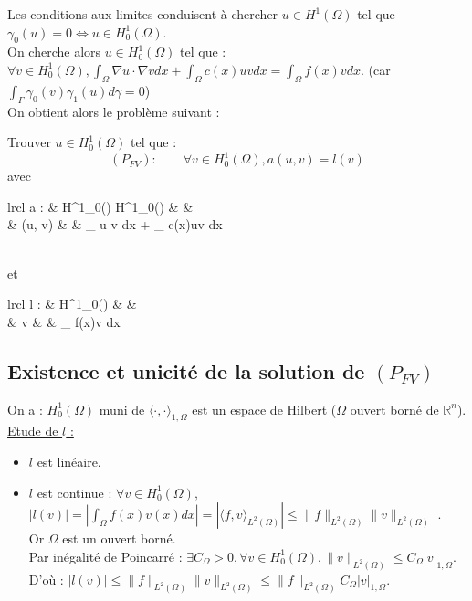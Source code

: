 \documentclass[12pt,a4paper]{article}
\newcommand{\important}[1]{%
    \begin{tcolorbox}[colback=red!10!white,colframe=red!30!black]
        #1
    \end{tcolorbox}
}
\begin{document}
Les conditions aux limites conduisent à chercher $u \in H^1(\Omega)$ tel que $\gamma_0(u) = 0 \Leftrightarrow u \in H^1_0(\Omega)$. \\

On cherche alors $u \in H^1_0(\Omega)$ tel que : \\
$\forall v \in H^1_0(\Omega), \int_{\Omega} \nabla u \cdot \nabla v dx + \int_{\Omega} c(x)uv dx = \int_{\Omega} f(x)v dx$. (car $\int_{\Gamma} \gamma_0(v) \gamma_1(u) d\gamma = 0$) \\

On obtient alors le problème suivant :

\important{
    Trouver $u \in H^1_0(\Omega)$ tel que :
    \begin{equation}
        (P_{FV}) : \qquad \forall v \in H^1_0(\Omega), a(u, v) = l(v)
    \end{equation}
    avec \begin{array}[t]{lrcl}
        a : & H^1_0(\Omega) \times H^1_0(\Omega) & \longrightarrow & \mathbb{R} \\
        & (u, v) & \longmapsto & \int_{\Omega} \nabla u \cdot \nabla v dx + \int_{\Omega} c(x)uv dx
    \end{array} \\
    et \begin{array}[t]{lrcl}
        l : & H^1_0(\Omega) & \longrightarrow & \mathbb{R} \\
        & v & \longmapsto & \int_{\Omega} f(x)v dx
    \end{array}
}


\subsection{Existence et unicité de la solution de $(P_{FV})$}

On a : $H^1_0(\Omega)$ muni de $\langle \cdot, \cdot \rangle_{1, \Omega}$ est un espace de Hilbert ($\Omega$ ouvert borné de $\mathbb{R}^n$). \\

\underline{Etude de $l$ :}
\begin{itemize}
    \item $l$ est linéaire.
    \item $l$ est continue : $\forall v \in H^1_0(\Omega),$ \\
    $|l(v)| = \left| \int_{\Omega} f(x)v(x) dx \right| = \left| \langle f, v \rangle_{L^2(\Omega)} \right| \leq \| f \|_{L^2(\Omega)} \| v \|_{L^2(\Omega)}$ . \\
    Or $\Omega$ est un ouvert borné. \\

    Par inégalité de Poincarré : $\exists C_{\Omega} > 0, \forall v \in H^1_0(\Omega), \| v \|_{L^2(\Omega)} \leq C_{\Omega} |v|_{1, \Omega}$. \\

    D'où : $|l(v)| \leq \| f \|_{L^2(\Omega)} \| v \|_{L^2(\Omega)} \leq \| f \|_{L^2(\Omega)} C_{\Omega} |v|_{1, \Omega}$. \\
\end{itemize}
\end{document}
